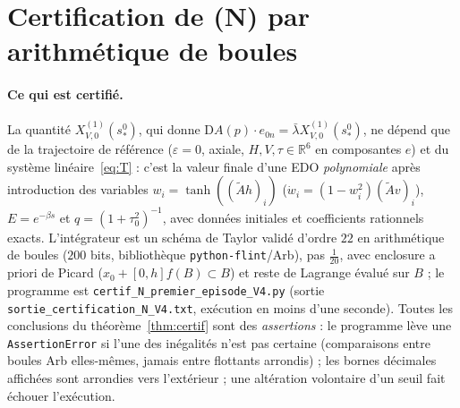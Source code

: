 \documentclass[11pt,a4paper]{article}
\theoremstyle{remark}
\newcommand{\R}{\mathbb R}
\newcommand{\D}{\mathrm D}
\begin{document}
\section{Certification de (N) par arithmétique de boules}\label{sec:certif}
\paragraph{Ce qui est certifié.} La quantité $X^{(1)}_{V,0}(s_*^0)$, qui donne $\D A(p)\cdot e_{0n}=\bar\lambda X^{(1)}_{V,0}(s_*^0)$, ne dépend que de la trajectoire de référence ($\varepsilon=0$, axiale, $H,V,\tau\in\R^{6}$ en composantes $e$) et du système linéaire~\eqref{eq:T} : c'est la valeur finale d'une EDO \emph{polynomiale} après introduction des variables $w_i=\tanh((\widetilde Ah)_i)$ ($\dot w_i=(1-w_i^2)(\widetilde Av)_i$), $E=e^{-\beta s}$ et $q=(1+\tau_0^2)^{-1}$, avec données initiales et coefficients rationnels exacts. L'intégrateur est un schéma de Taylor validé d'ordre $22$ en arithmétique de boules ($200$ bits, bibliothèque \texttt{python-flint}/Arb), pas $\frac1{20}$, avec enclosure a priori de Picard ($x_0+[0,h]f(B)\subset B$) et reste de Lagrange évalué sur $B$ ; le programme est \texttt{certif\_N\_premier\_episode\_V4.py} (sortie \texttt{sortie\_certification\_N\_V4.txt}, exécution en moins d'une seconde). Toutes les conclusions du théorème~\ref{thm:certif} sont des \emph{assertions} : le programme lève une \texttt{AssertionError} si l'une des inégalités n'est pas certaine (comparaisons entre boules Arb elles-mêmes, jamais entre flottants arrondis) ; les bornes décimales affichées sont arrondies vers l'extérieur ; une altération volontaire d'un seuil fait échouer l'exécution.
\end{document}
